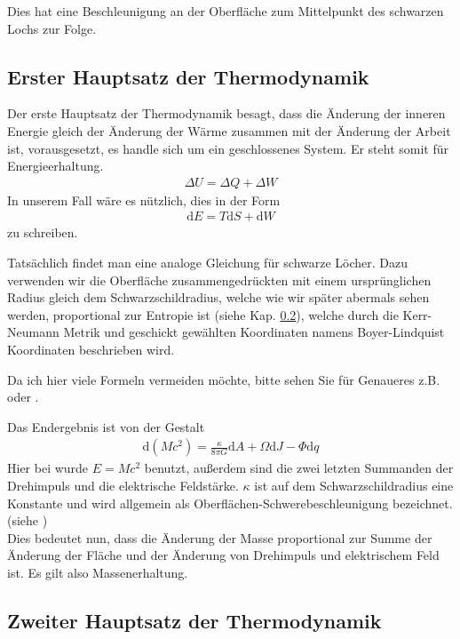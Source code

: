 \documentclass[ngerman]{scrartcl}
\newcommand{\diff}{\mathrm{d}}
\begin{document}
	Dies hat eine Beschleunigung an der Oberfläche zum Mittelpunkt des schwarzen Lochs zur Folge. 

	\subsection{Erster Hauptsatz der Thermodynamik}
	Der erste Hauptsatz der Thermodynamik besagt, dass die Änderung der inneren Energie gleich der Änderung der Wärme zusammen mit der Änderung der Arbeit ist, vorausgesetzt, es handle sich um ein geschlossenes System. Er steht somit für Energieerhaltung.
		\begin{align}
			\Delta U = \Delta Q + \Delta W
		\end{align}
	In unserem Fall wäre es nützlich, dies in der Form
		\begin{align}
			\diff E = T\diff S + \diff W
		\end{align}
	zu schreiben. 
	
	Tatsächlich findet man eine analoge Gleichung für schwarze Löcher.
	Dazu verwenden wir die Oberfläche zusammengedrückten mit einem ursprünglichen Radius gleich dem Schwarzschildradius, welche wie wir später abermals sehen werden, proportional zur Entropie ist (siehe Kap. \ref{zweiterHS}), welche durch die Kerr-Neumann Metrik und geschickt gewählten Koordinaten namens Boyer-Lindquist Koordinaten beschrieben wird. 
	
	Da ich hier viele Formeln vermeiden möchte, bitte sehen Sie für Genaueres z.B. \cite{BekensteinHawking} oder \cite{Gebhardt}.
	
	Das Endergebnis ist von der Gestalt
		\begin{align}
			\diff (Mc^2) = \frac{\kappa}{8 \pi G} \diff A + \Omega \diff J - \Phi \diff q
		\end{align} 
	Hier bei wurde $E = Mc^2$ benutzt, außerdem sind die zwei letzten Summanden der Drehimpuls und die elektrische Feldstärke. $\kappa$ ist auf dem Schwarzschildradius eine Konstante und wird allgemein als Oberflächen-Schwerebeschleunigung bezeichnet. (siehe \cite{Gebhardt})
	\\
	
	Dies bedeutet nun, dass die Änderung der Masse proportional zur Summe der Änderung der Fläche und der Änderung von Drehimpuls und elektrischem Feld ist. Es gilt also Massenerhaltung. 

	\subsection{Zweiter Hauptsatz der Thermodynamik} \label{zweiterHS}
\end{document}

